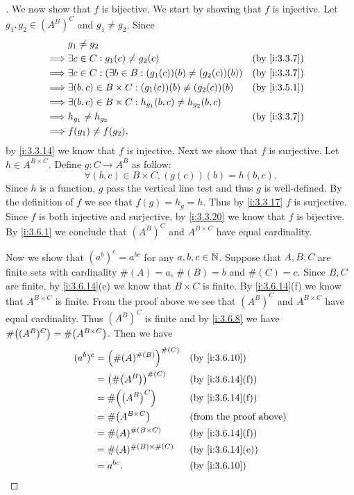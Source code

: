 \begin{proof}[]
  We now show that \(f\) is bijective.
  We start by showing that \(f\) is injective.
  Let \(g_1, g_2 \in (A^B)^C\) and \(g_1 \neq g_2\).
  Since
  \begin{align*}
             & g_1 \neq g_2                                                                         \\
    \implies & \exists c \in C : g_1(c) \neq g_2(c)                               &  & \by{i:3.3.7} \\
    \implies & \exists c \in C : (\exists b \in B : (g_1(c))(b) \neq (g_2(c))(b)) &  & \by{i:3.3.7} \\
    \implies & \exists (b, c) \in B \times C : (g_1(c))(b) \neq (g_2(c))(b)       &  & \by{i:3.5.1} \\
    \implies & \exists (b, c) \in B \times C : h_{g_1}(b, c) \neq h_{g_2}(b, c)                     \\
    \implies & h_{g_1} \neq h_{g_2}                                               &  & \by{i:3.3.7} \\
    \implies & f(g_1) \neq f(g_2),
  \end{align*}
  by \cref{i:3.3.14} we know that \(f\) is injective.
  Next we show that \(f\) is surjective.
  Let \(h \in A^{B \times C}\).
  Define \(g : C \to A^B\) as follow:
  \[
    \forall (b, c) \in B \times C, (g(c))(b) = h(b, c).
  \]
  Since \(h\) is a function, \(g\) pass the vertical line test and thus \(g\) is well-defined.
  By the definition of \(f\) we see that \(f(g) = h_g = h\).
  Thus by \cref{i:3.3.17} \(f\) is surjective.
  Since \(f\) is both injective and surjective, by \cref{i:3.3.20} we know that \(f\) is bijective.
  By \cref{i:3.6.1} we conclude that \((A^B)^C\) and \(A^{B \times C}\) have equal cardinality.

  Now we show that \((a^b)^c = a^{bc}\) for any \(a, b, c \in \mathbb{N}\).
  Suppose that \(A, B, C\) are finite sets with cardinality \(\#(A) = a\), \(\#(B) = b\) and \(\#(C) = c\).
  Since \(B, C\) are finite, by \cref{i:3.6.14}(e) we know that \(B \times C\) is finite.
  By \cref{i:3.6.14}(f) we know that \(A^{B \times C}\) is finite.
  From the proof above we see that \((A^B)^C\) and \(A^{B \times C}\) have equal cardinality.
  Thus \((A^B)^C\) is finite and by \cref{i:3.6.8} we have \(\#\pa{(A^B)^C} = \#\pa{A^{B \times C}}\).
  Then we have
  \begin{align*}
    (a^b)^c & = \pa{\#(A)^{\#(B)}}^{\#(C)} &  & \by{i:3.6.10}                 \\
            & = \pa{\#\pa{A^B}}^{\#(C)}    &  & \by{i:3.6.14}[f]              \\
            & = \#\pa{\pa{A^B}^C}          &  & \by{i:3.6.14}[f]              \\
            & = \#\pa{A^{B \times C}}      &  & \text{(from the proof above)} \\
            & = \#(A)^{\#(B \times C)}     &  & \by{i:3.6.14}[f]              \\
            & = \#(A)^{\#(B) \times \#(C)} &  & \by{i:3.6.14}[e]              \\
            & = a^{bc}.                    &  & \by{i:3.6.10}
  \end{align*}


\end{proof}
